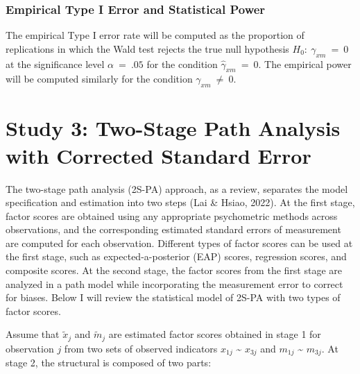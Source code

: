 \documentclass[
  11pt,
  man]{apa6}
\begin{document}
\hypertarget{empirical-type-i-error-and-statistical-power}{%
\subsubsection{Empirical Type I Error and Statistical Power}\label{empirical-type-i-error-and-statistical-power}}

The empirical Type I error rate will be computed as the proportion of replications in which the Wald test rejects the true null hypothesis \(H_{0}: \ \gamma_{xm} \ = \ 0\) at the significance level \(\alpha \ = \ .05\) for the condition \(\hat{\gamma}_{xm} \ = \ 0\). The empirical power will be computed similarly for the condition \(\gamma_{xm} \ \neq \ 0\).

\newpage

\hypertarget{study-3-two-stage-path-analysis-with-corrected-standard-error}{%
\section{Study 3: Two-Stage Path Analysis with Corrected Standard Error}\label{study-3-two-stage-path-analysis-with-corrected-standard-error}}

The two-stage path analysis (2S-PA) approach, as a review, separates the model specification and estimation into two steps (Lai \& Hsiao, 2022). At the first stage, factor scores are obtained using any appropriate psychometric methods across observations, and the corresponding estimated standard errors of measurement are computed for each observation. Different types of factor scores can be used at the first stage, such as expected-a-posterior (EAP) scores, regression scores, and composite scores. At the second stage, the factor scores from the first stage are analyzed in a path model while incorporating the measurement error to correct for biases. Below I will review the statistical model of 2S-PA with two types of factor scores.

Assume that \(\tilde{x}_{j}\) and \(\tilde{m}_{j}\) are estimated factor scores obtained in stage 1 for observation \(j\) from two sets of observed indicators \(x_{1j}\) \textasciitilde{} \(x_{3j}\) and \(m_{1j}\) \textasciitilde{} \(m_{3j}\). At stage 2, the structural is composed of two parts:
\end{document}

